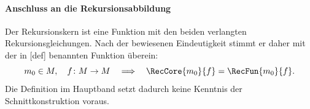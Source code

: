 \begin{tabproofsplit}


\closeproofpart

  \setcounter{proofstepnr}{12}%

\closeproofpart
\end{tabproofsplit}


\paragraph{Anschluss an die Rekursionsabbildung}
Der Rekursionskern ist eine Funktion mit den beiden verlangten
Rekursionsgleichungen. Nach der bewiesenen Eindeutigkeit stimmt er daher
mit der in [def] benannten Funktion überein:
\[
  m_0\in M,\quad f\colon M\to M
  \quad\Longrightarrow\quad
  \RecCore{m_0}{f}=\RecFun{m_0}{f}.
\]
Die Definition im Hauptband setzt dadurch keine Kenntnis der
Schnittkonstruktion voraus.
